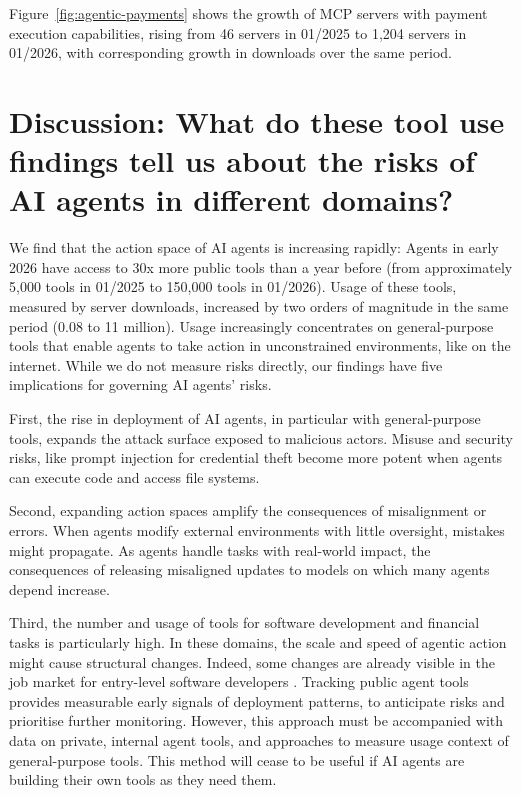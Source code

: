 \documentclass[manuscript,screen,nonacm,oneside]{acmart}
\begin{document}
Figure~\ref{fig:agentic-payments} shows the growth of MCP servers with payment execution capabilities, rising from 46 servers in 01/2025 to 1,204 servers in 01/2026, with corresponding growth in downloads over the same period.

\section{Discussion: What do these tool use findings tell us about the risks of AI agents in different domains?}
\label{sec:discussion}
We find that the action space of AI agents is increasing rapidly: Agents in early 2026 have access to 30x more public tools than a year before (from approximately 5,000 tools in 01/2025 to 150,000 tools in 01/2026). Usage of these tools, measured by server downloads, increased by two orders of magnitude in the same period (0.08 to 11 million). Usage  increasingly concentrates on general-purpose tools that enable agents to take action in unconstrained environments, like on the internet. While we do not measure risks directly, our findings have five implications for governing AI agents' risks.

First, the rise in deployment of AI agents, in particular with general-purpose tools, expands the attack surface exposed to malicious actors. Misuse and security risks, like prompt injection for credential theft become more potent when agents can execute code and access file systems.

Second, expanding action spaces amplify the consequences of misalignment or errors. When agents modify external environments with little oversight, mistakes might propagate. As agents handle tasks with real-world impact, the consequences of releasing misaligned updates to models on which many agents depend increase. 

Third, the number and usage of tools for software development and financial tasks is particularly high. In these domains, the scale and speed of agentic action might cause structural changes. Indeed, some changes are already visible in the job market for entry-level software developers \citep{brynjolfsson2025canaries}. Tracking public agent tools provides measurable early signals of deployment patterns, to anticipate risks and prioritise further monitoring. However, this approach must be accompanied with data on private, internal agent tools, and approaches to measure usage context of general-purpose tools. This method will cease to be useful if AI agents are building their own tools as they need them. 
\end{document}
